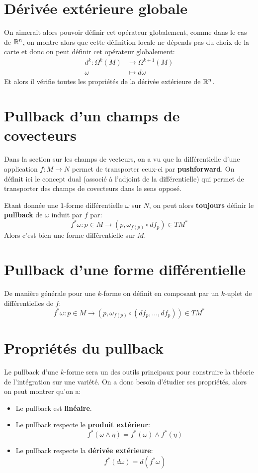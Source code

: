 \section{Dérivée extérieure globale}
On aimerait alors pouvoir définir cet opérateur globalement, comme dans le cas de \( \mathbb{R}^n \), on montre alors que cette définition locale ne dépends pas du choix de la carte et donc on peut définir cet opérateur globalement:
\[ 
   \begin{aligned}
      d^k : \Omega^k(M) &\longrightarrow \Omega^{k+1}(M) \\
      \omega &\longmapsto d \omega
   \end{aligned} 
\]
Et alors il vérifie toutes les propriétés de la dérivée extérieure de \( \mathbb{R}^n \).
\section{Pullback d'un champs de covecteurs}
Dans la section sur les champs de vecteurs, on a vu que la différentielle d'une application \( f : M \longrightarrow N \) permet de transporter ceux-ci par \textbf{pushforward}. On définit ici le concept dual (associé à l'adjoint de la différentielle) qui permet de transporter des champs de covecteurs dans le sens opposé.\<

Etant donnée une \( 1 \)-forme différentielle \( \omega \) sur \( N \), on peut alors \textbf{toujours} définir le \textbf{pullback} de \( \omega \) induit par \( f \) par:
\[ 
   f^*\omega : p \in M \longrightarrow (p, \omega_{f(p)} \circ df_p) \in TM^*
\]
Alors c'est bien une forme différentielle sur \( M \). 
\section{Pullback d'une forme différentielle}
De manière générale pour une \( k \)-forme on définit en composant par un \( k \)-uplet de différentielles de \( f \):
\[ 
   f^*\omega : p \in M \longrightarrow (p, \omega_{f(p)} \circ (df_p, \ldots, df_p)) \in TM^*
\]
\section{Propriétés du pullback}
Le pullback d'une \( k \)-forme sera un des outils principaux pour construire la théorie de l'intégration sur une variété. On a donc besoin d'étudier ses propriétés, alors on peut montrer qu'on a:
\begin{itemize}
   \item Le pullback est \textbf{linéaire}.
   \item Le pullback respecte le \textbf{produit extérieur}:
   \[ 
      f^*(\omega \wedge \eta) = f^*(\omega) \wedge f^*(\eta)
   \]
   \item Le pullback respecte la \textbf{dérivée extérieure}:
   \[ 
      f^*(d\omega) = d(f^*\omega)
   \]
\end{itemize}
